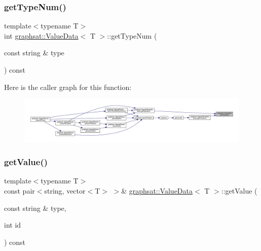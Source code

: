 \subsubsection{\texorpdfstring{getTypeNum()}{getTypeNum()}}
{\footnotesize\ttfamily template$<$typename T$>$ \\
int \mbox{\hyperlink{classgraphsat_1_1_value_data}{graphsat\+::\+Value\+Data}}$<$ T $>$\+::get\+Type\+Num (\begin{DoxyParamCaption}\item[{const string \&}]{type }\end{DoxyParamCaption}) const\hspace{0.3cm}{\ttfamily [inline]}}

Here is the caller graph for this function\+:
\nopagebreak
\begin{figure}[H]
\begin{center}
\leavevmode
\includegraphics[width=350pt]{classgraphsat_1_1_value_data_ab6782ef0d92876cb39ea1a8bf2d486c6_icgraph}
\end{center}
\end{figure}
\mbox{\label{classgraphsat_1_1_value_data_a393f4c36450ba089b2b19a39f1094bf3}} 
\subsubsection{\texorpdfstring{getValue()}{getValue()}\hspace{0.1cm}{\footnotesize\ttfamily [1/3]}}
{\footnotesize\ttfamily template$<$typename T$>$ \\
const pair$<$string, vector$<$T$>$ $>$\& \mbox{\hyperlink{classgraphsat_1_1_value_data}{graphsat\+::\+Value\+Data}}$<$ T $>$\+::get\+Value (\begin{DoxyParamCaption}\item[{const string \&}]{type,  }\item[{int}]{id }\end{DoxyParamCaption}) const\hspace{0.3cm}{\ttfamily [inline]}}

